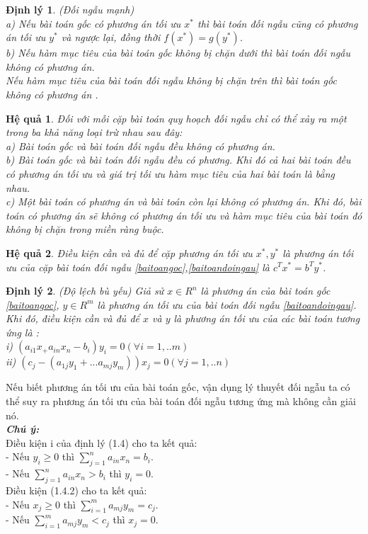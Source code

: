 \documentclass[12pt,a4paper]{report}
\newtheorem{dl}{Định lý}
\newtheorem{hq}{Hệ quả}
\begin{document}
\begin{itemize}
\begin{dl}
        (Đối ngẫu mạnh) \\
      a) Nếu bài toán gốc có phương án tối ưu $x^*$ thì bài toán đối ngẫu cũng có phương án tối ưu $y^*$ và ngược lại, đồng thời $f(x^*)=g(y^*)$.\\
      b) Nếu hàm mục tiêu của bài toán gốc không bị chặn dưới thì bài toán đối ngẫu không có phương án.\\
        Nếu hàm mục tiêu của bài toán đối ngẫu không bị chặn trên thì bài toán gốc không có phương án .
    \end{dl}

\begin{hq}
        Đối với mỗi cặp bài toán quy hoạch đối ngẫu chỉ có thể xảy ra một trong ba khả năng loại trừ nhau sau đây:\\
        a) Bài toán gốc và bài toán đối ngẫu đều không có phương án.\\
        b) Bài toán gốc và bài toán đối ngẫu đều có phương. Khi đó cả hai bài toán đều có phương án tối ưu và giá trị tối ưu hàm mục tiêu của hai bài toán là bằng nhau.\\
        c) Một bài toán có phương án và bài toán còn lại không có phương án. Khi đó, bài toán có phương án sẽ không có phương án tối ưu và hàm mục tiêu của bài toán đó không bị chặn trong miền ràng buộc.
    \end{hq}
    \begin{hq}
        Điều kiện cần và đủ để cặp phương án tối ưu $x^*,y^*$ là phương án tối ưu của cặp bài toán đối ngẫu \eqref{baitoangoc},\eqref{baitoandoingau} là $c^Tx^*=b^Ty^*$.
    \end{hq}
    \begin{dl}
        (Độ lệch bù yếu) Giả sử $x \in R^n$ là phương án của bài toán gốc \eqref{baitoangoc}, $y\in R^m$ là phương án tối ưu của bài toán đối ngẫu \eqref{baitoandoingau}. Khi đó, điều kiện cần và đủ để $x$ và $y$ là phương án tối ưu của các bài toán tương ứng là :\\
        i) $(a_{i1}x_ +a_{in}x_n -b_i)y_i=0 (\forall {i=1,..m}) $ \\
        ii) $(c_j-(a_{1j} y_1+...a_{mj}y_m))x_j=0 (\forall{j=1,..n}) $ \\   
    \end{dl}
    Nếu biết phương án tối ưu của bài toán gốc, vận dụng lý thuyết đối ngẫu ta có thể suy ra phương án tối ưu của bài toán đối ngẫu tương ứng mà không cần giải nó.\\
    \textbf{\textit{Chú ý:}} \\
    Điều kiện i của định lý (1.4) cho ta kết quả:\\
        - Nếu $y_i \ge 0 $ thì $\sum_{j=1}^n a_{in}x_n=b_i.$\\
        - Nếu $\sum_{j=1}^n a_{in}x_n >b_i$ thì $y_i=0$.\\ 
    Điều kiện (1.4.2) cho ta kết quả:\\
        - Nếu $x_j \ge 0$ thì $\sum_{i=1}^m a_{mj}y_m=c_j.$\\
        - Nếu $\sum_{i=1}^m a_{mj}y_m<c_j$ thì $x_j=0$.\\
    \end{itemize}
\end{document}
